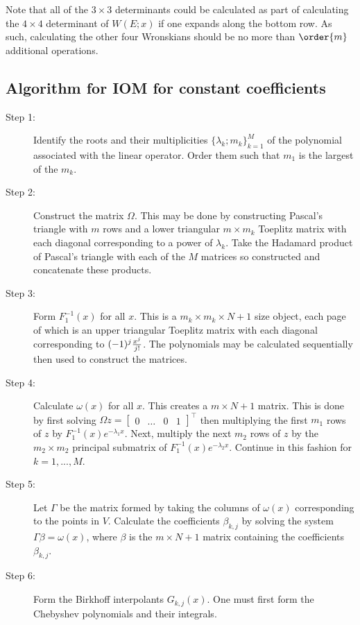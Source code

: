 \documentclass{article}
\begin{document}
Note that all of the $3 \times 3$ determinants could be calculated as part of calculating the $4 \times 4$ determinant of $W(E;x)$ if one expands along the bottom row.
As such, calculating the other four Wronskians should be no more than $\order{m}$ additional operations.

\subsection{Algorithm for IOM for constant coefficients}

\begin{description}
\item[Step 1:] Identify the roots and their multiplicities $\{ \lambda_k ; m_k \}_{k=1}^M$ of the polynomial associated with the linear operator.
Order them such that $m_1$ is the largest of the $m_k$.
\item[Step 2:] Construct the matrix $\Omega$.
This may be done by constructing Pascal's triangle with $m$ rows and a lower triangular $m \times m_k$ Toeplitz matrix with each diagonal corresponding to a power of $\lambda_k$.
Take the Hadamard product of Pascal's triangle with each of the $M$ matrices so constructed and concatenate these products.
\item[Step 3:] Form $F_1^{-1}(x)$ for all $x$.
This is a $m_k \times m_k \times N+1$ size object, each page of which is an upper triangular Toeplitz matrix with each diagonal corresponding to $(-1)^j \frac{x^j}{j!}$.
The polynomials may be calculated sequentially then used to construct the matrices.
\item[Step 4:] Calculate $\omega(x)$ for all $x$.
This creates a $m \times N+1$ matrix.
This is done by first solving $\Omega z = \begin{bmatrix} 0 & \dots & 0 & 1 \end{bmatrix}^\top$ then multiplying the first $m_1$ rows of $z$ by $F_1^{-1}(x) e^{-\lambda_1 x}$.
Next, multiply the next $m_2$ rows of $z$ by the $m_2 \times m_2$ principal submatrix of $F_1^{-1}(x) e^{-\lambda_2 x}$.
Continue in this fashion for $k=1,...,M$.
\item[Step 5:] Let $\Gamma$ be the matrix formed by taking the columns of $\omega(x)$ corresponding to the points in $V$.
Calculate the coefficients $\beta_{k,j}$ by solving the system $\Gamma \beta = \omega(x)$, where $\beta$ is the $m \times N+1$ matrix containing the coefficients $\beta_{k,j}$.
\item[Step 6:] Form the Birkhoff interpolants $G_{k,j}(x)$.
One must first form the Chebyshev polynomials and their integrals.

\end{description}
\end{document}
